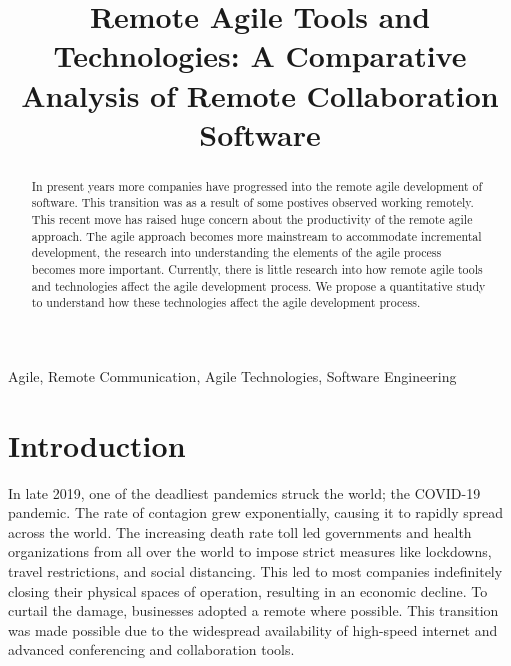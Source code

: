 \documentclass[conference]{IEEEtran}
\begin{document}
\title{Remote Agile Tools and Technologies: A Comparative Analysis of Remote Collaboration Software\\
}

\author{

}


\maketitle
\begin{abstract}
    In present years more companies have progressed into the remote agile development of software. This transition was as a result of some postives observed working remotely. This recent move has raised huge concern about the productivity of the remote agile approach. The agile approach becomes more mainstream to accommodate incremental development, the research into understanding the elements of the agile process becomes more important. Currently, there is little research into how remote agile tools and technologies affect the agile development process. We propose a quantitative study to understand how these technologies affect the agile development process.
\end{abstract}

\begin{IEEEkeywords}
Agile, Remote Communication, Agile Technologies, Software Engineering
\end{IEEEkeywords}

\section{Introduction}
In late 2019, one of the deadliest pandemics struck the world; the COVID-19 pandemic. The rate of contagion grew exponentially, causing it to rapidly spread across the world. The increasing death rate toll led governments and health organizations from all over the world to impose strict measures like lockdowns, travel restrictions, and social distancing. This led to most companies indefinitely closing their physical spaces of operation, resulting in an economic decline. To curtail the damage, businesses adopted a remote where possible. This transition was made possible due to the widespread availability of high-speed internet and advanced conferencing and collaboration tools.
\end{document}
